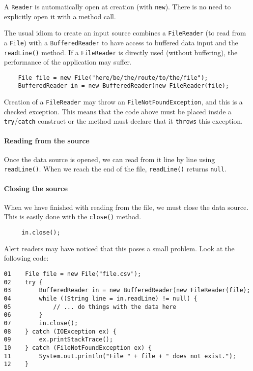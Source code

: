 A \verb+Reader+ is automatically open at creation (with
\verb+new+). There is no need to explicitly open it with a method
call. 

The usual idiom to create an input source
combines a \verb+FileReader+ (to read from a
\verb+File+) with a \verb+BufferedReader+ to have access to buffered
data input and the \verb+readLine()+ method. If a \verb+FileReader+ is
directly used (without buffering), the performance of the application
may suffer. 

\begin{verbatim}
    File file = new File("here/be/the/route/to/the/file");
    BufferedReader in = new BufferedReader(new FileReader(file); 
\end{verbatim}

Creation of a \verb+FileReader+ may throw an
\verb+FileNotFoundException+, and this is a checked exception. This
means that the code above must be placed inside a \verb+try+/\verb+catch+
construct or the method must declare that it \verb+throws+ this
exception. 

\paragraph{Reading from the source}
\label{sec:reading-from-source}

Once the data source is opened, we can read from it line by line using
\verb+readLine()+. When we reach the end of the file,
\verb+readLine()+ returns \verb+null+. 


\paragraph{Closing the source}
\label{sec:closing-source}

When we have finished with reading from the file, we must close the
data source. This is easily done with the \verb+close()+ method. 

\begin{verbatim}
     in.close();
\end{verbatim}

Alert readers may have noticed that this poses a small problem. Look
at the following code: 

\begin{verbatim}
01    File file = new File("file.csv");
02    try {
03        BufferedReader in = new BufferedReader(new FileReader(file); 
04        while ((String line = in.readLine) != null) {
05            // ... do things with the data here
06        }
07        in.close();
08    } catch (IOException ex) {
09        ex.printStackTrace();
10    } catch (FileNotFoundException ex) {
11        System.out.println("File " + file + " does not exist.");
12    }    
\end{verbatim}

